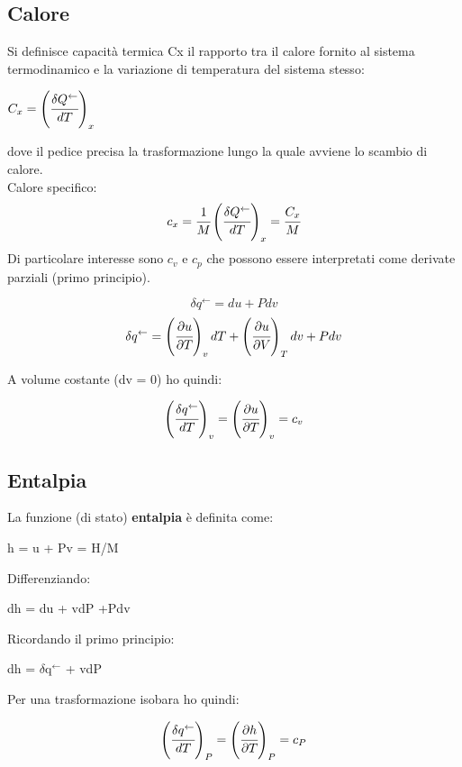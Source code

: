 \documentclass[a4paper,12pt,titlepage]{article}
\begin{document}
\subsection{Calore}
Si definisce capacità termica Cx il rapporto tra il calore fornito al sistema termodinamico e la variazione di temperatura del sistema stesso:
\begin{center}
$C_{x} = \left( \cfrac{\delta Q^{\leftarrow}}{dT} \right)_{x} $
\end{center}
dove il pedice precisa la trasformazione lungo la quale avviene lo scambio di calore.\\
Calore specifico: $$ c_{x} = \cfrac{1}{M} \left( \cfrac{\delta Q ^{\leftarrow}}{dT}  \right)_{x} = \cfrac{C_{x}}{M}$$
Di particolare interesse sono $c_{v}$ e $c_{p}$ che possono essere interpretati come derivate parziali (primo principio).
\begin{center}
$$\delta q^{\leftarrow} = du +Pdv  $$
$$\delta q^{\leftarrow} = \left( \cfrac{\partial u}{\partial T} \right)_{v}dT + 
\left( \cfrac{\partial u}{\partial V} \right)_{T}dv + Pdv$$
\end{center}
A volume costante (dv = 0) ho quindi:
\begin{center}
$$\left( \cfrac{\delta q^{\leftarrow}}{dT} \right)_{v}
=  \left( \cfrac{\partial u}{\partial T} \right)_{v} = c_{v} $$
\end{center}
\clearpage
\subsection{Entalpia}
La funzione (di stato) \textbf{entalpia} è definita come:
\begin{center}
h = u + Pv = H/M
\end{center} 
Differenziando:
\begin{center}
dh = du + vdP +Pdv
\end{center}
Ricordando il primo principio:
\begin{center}
dh = $\delta $q$^{\leftarrow}$ + vdP
\end{center}
Per una trasformazione isobara ho quindi: 
\begin{center}
$$\left( \cfrac{\delta q^{\leftarrow}}{dT} \right)_{P}
=  \left( \cfrac{\partial h}{\partial T} \right)_{P} = c_{P} $$
\end{center}
\end{document}
